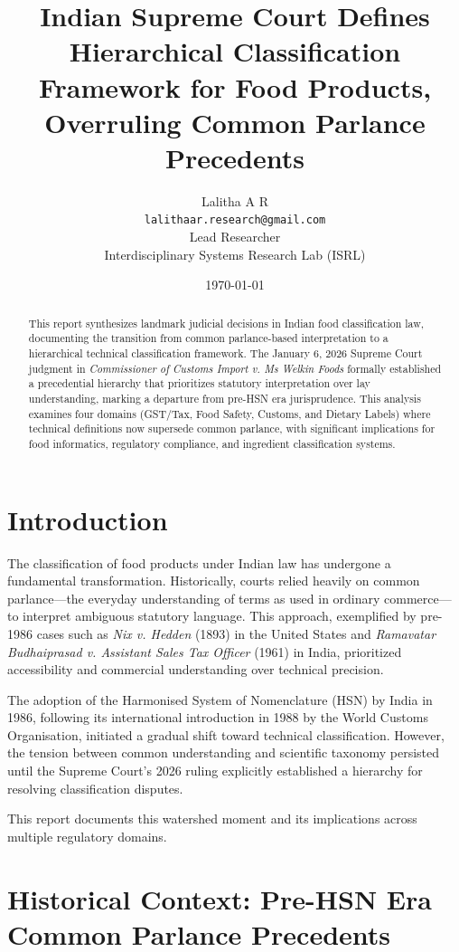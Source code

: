 \documentclass[12pt,a4paper]{article}
\title{Indian Supreme Court Defines Hierarchical Classification Framework for Food Products, Overruling Common Parlance Precedents}
\author{Lalitha A R\\
\texttt{lalithaar.research@gmail.com}\\
Lead Researcher\\
Interdisciplinary Systems Research Lab (ISRL)}
\date{\today}
\begin{document}
\maketitle

\begin{abstract}
This report synthesizes landmark judicial decisions in Indian food classification law, documenting the transition from common parlance-based interpretation to a hierarchical technical classification framework. The January 6, 2026 Supreme Court judgment in \textit{Commissioner of Customs Import v. Ms Welkin Foods} formally established a precedential hierarchy that prioritizes statutory interpretation over lay understanding, marking a departure from pre-HSN era jurisprudence. This analysis examines four domains (GST/Tax, Food Safety, Customs, and Dietary Labels) where technical definitions now supersede common parlance, with significant implications for food informatics, regulatory compliance, and ingredient classification systems.
\end{abstract}

\section{Introduction}

The classification of food products under Indian law has undergone a fundamental transformation. Historically, courts relied heavily on common parlance---the everyday understanding of terms as used in ordinary commerce---to interpret ambiguous statutory language. This approach, exemplified by pre-1986 cases such as \textit{Nix v. Hedden} (1893) in the United States and \textit{Ramavatar Budhaiprasad v. Assistant Sales Tax Officer} (1961) in India, prioritized accessibility and commercial understanding over technical precision.

The adoption of the Harmonised System of Nomenclature (HSN) by India in 1986, following its international introduction in 1988 by the World Customs Organisation, initiated a gradual shift toward technical classification. However, the tension between common understanding and scientific taxonomy persisted until the Supreme Court's 2026 ruling explicitly established a hierarchy for resolving classification disputes.

This report documents this watershed moment and its implications across multiple regulatory domains.

\section{Historical Context: Pre-HSN Era Common Parlance Precedents}
\end{document}
